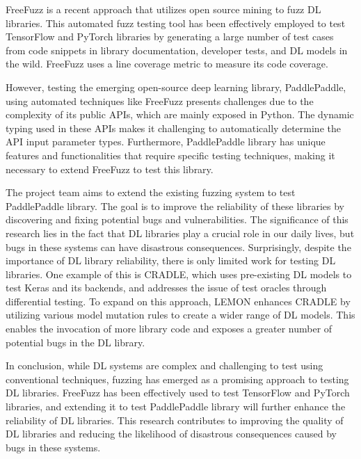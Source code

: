 \documentclass[sigconf]{acmart}
\begin{document}
\par FreeFuzz is a recent approach that utilizes open source mining to fuzz DL libraries. This automated fuzz testing tool has been effectively employed to test TensorFlow and PyTorch libraries by generating a large number of test cases from code snippets in library documentation, developer tests, and DL models in the wild. FreeFuzz uses a line coverage metric to measure its code coverage.
\par However, testing the emerging open-source deep learning library, PaddlePaddle, using automated techniques like FreeFuzz presents challenges due to the complexity of its public APIs, which are mainly exposed in Python. The dynamic typing used in these APIs makes it challenging to automatically determine the API input parameter types. Furthermore, PaddlePaddle library has unique features and functionalities that require specific testing techniques, making it necessary to extend FreeFuzz to test this library.
\par The project team aims to extend the existing fuzzing system to test PaddlePaddle library. The goal is to improve the reliability of these libraries by discovering and fixing potential bugs and vulnerabilities. The significance of this research lies in the fact that DL libraries play a crucial role in our daily lives, but bugs in these systems can have disastrous consequences. Surprisingly, despite the importance of DL library reliability, there is only limited work for testing DL libraries. One example of this is CRADLE, which uses pre-existing DL models to test Keras and its backends, and addresses the issue of test oracles through differential testing. To expand on this approach, LEMON enhances CRADLE by utilizing various model mutation rules to create a wider range of DL models. This enables the invocation of more library code and exposes a greater number of potential bugs in the DL library.
\par In conclusion, while DL systems are complex and challenging to test using conventional techniques, fuzzing has emerged as a promising approach to testing DL libraries. FreeFuzz has been effectively used to test TensorFlow and PyTorch libraries, and extending it to test PaddlePaddle library will further enhance the reliability of DL libraries. This research contributes to improving the quality of DL libraries and reducing the likelihood of disastrous consequences caused by bugs in these systems.
\end{document}
